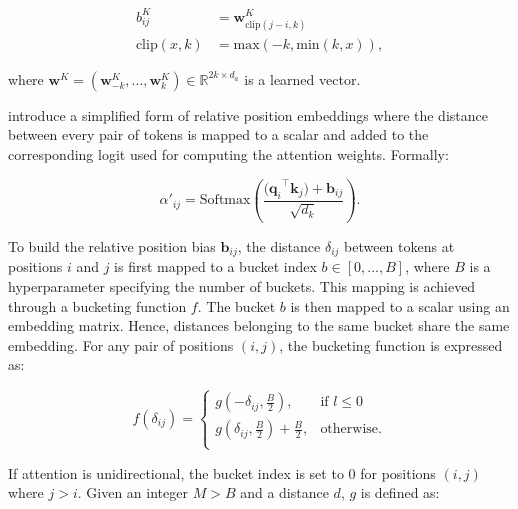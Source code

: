 \begin{equation}
\begin{aligned}
    b^K_{ij} &= \bm{w}^K_{\text{clip}(j-i, k)} \\
    \text{clip}(x, k) &= \text{max}(-k, \text{min}(k, x)),
\end{aligned}
\end{equation}

\noindent where $\bm{w}^K = (\bm{w}^K_{-k}, \ldots, \bm{w}^K_{k}) \in \mathbb{R}^{2k \times d_a}$ is a learned vector.

\citet{raffel2020exploring} introduce a simplified form of relative position embeddings where the distance between every pair of tokens is mapped to a scalar and added to the corresponding logit used for computing the attention weights. Formally:

\begin{equation}
    \alpha'_{ij} = \mathrm{Softmax}\left(\frac{{(\bm{q}_i}^{\top} \bm{k}_j) + \bm{b}_{ij}}{\sqrt{d_k}}\right).
\end{equation}

\noindent To build the relative position bias $\bm{b}_{ij}$, the distance $\delta_{ij}$ between tokens at positions $i$ and $j$ is first mapped to a bucket index $b \in [0, \ldots, B]$, where $B$ is a hyperparameter specifying the number of buckets. This mapping is achieved through a bucketing function $f$. The bucket $b$ is then mapped to a scalar using an embedding matrix. Hence, distances belonging to the same bucket share the same embedding. For any pair of positions $(i, j)$, the bucketing function is expressed as:

\begin{equation}
    f(\delta_{ij}) = 
    \begin{cases}
        g\left(-\delta_{ij}, \frac{B}{2}\right), & \text{if } l \leq 0 \\
        g\left(\delta_{ij}, \frac{B}{2}\right) + \frac{B}{2}, & \text{otherwise.} \\
    \end{cases}
\end{equation}

\noindent If attention is unidirectional, the bucket index is set to $0$ for positions $(i, j)$ where $j > i$. Given an integer $M > B$ and a distance $d$, $g$ is defined as:

